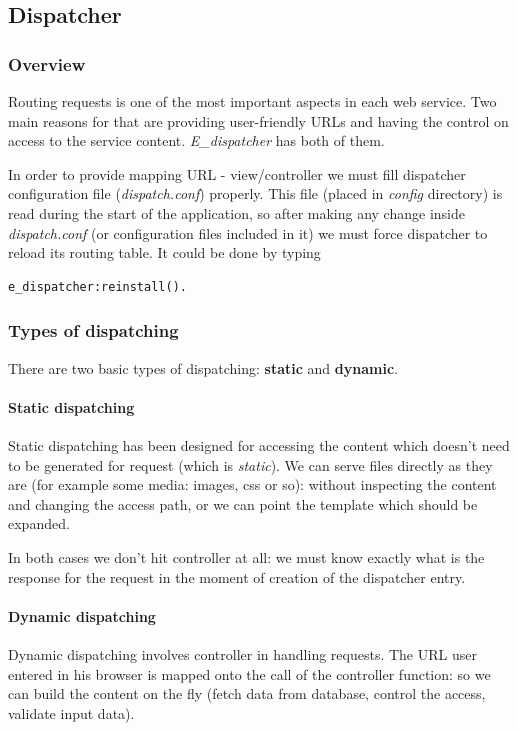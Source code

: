 \subsection{Dispatcher}
\subsubsection{Overview}Routing requests is one of the most important aspects in each web service. 
Two main reasons for that are providing user-friendly URLs and having the control on access to the service content. 
{\it E\_dispatcher} has both of them.

In order to provide mapping URL - view/controller we must fill dispatcher configuration file ({\it dispatch.conf}) properly. 
This file (placed in {\it config} directory) is read during the start of the application, 
so after making any change inside {\it dispatch.conf} (or configuration files included in it) we must force dispatcher to reload its routing table. 
It could be done by typing
\begin{verbatim}
e_dispatcher:reinstall().
\end{verbatim}

\subsubsection{Types of dispatching}There are two basic types of dispatching: {\bf static} and {\bf dynamic}.
\paragraph{Static dispatching}
Static dispatching has been designed for accessing the content which doesn't need to be generated for request (which is {\it static}). 
We can serve files directly as they are (for example some media: images, css or so): 
without inspecting the content and changing the access path, or we can point the template which should be expanded. 

In both cases we don't hit controller at all: we must know exactly what is the response for the request in the moment of creation of the dispatcher entry.
\paragraph{Dynamic dispatching}
Dynamic dispatching involves controller in handling requests. 
The URL user entered in his browser is mapped onto the call of the controller function: 
so we can build the content on the fly (fetch data from database, control the access, validate input data).

